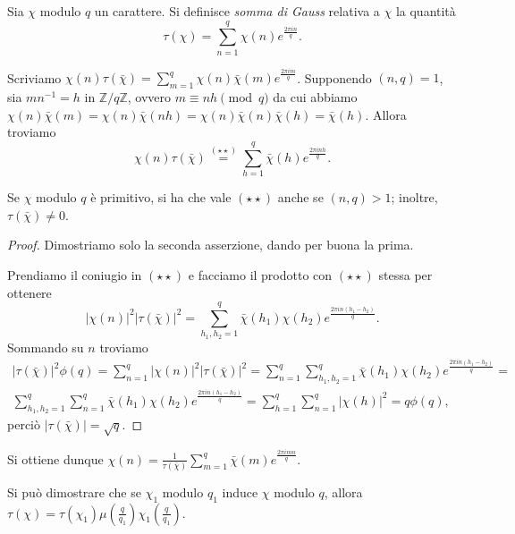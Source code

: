 \begin{defn}
  Sia $\chi$ modulo $q$ un carattere. Si definisce \textit{somma di Gauss} relativa a $\chi$ la quantità
  $$\tau(\chi)=\sum_{n=1}^q\chi(n)e^{\frac{2\pi in}{q}}.$$
\end{defn}

\begin{oss}
  Scriviamo $\displaystyle \chi(n)\tau(\bar{\chi})=\sum_{m=1}^q \chi(n)\bar{\chi}(m)e^{\frac{2\pi im}{q}}$.
  Supponendo $(n,q)=1$, sia $mn^{-1}=h$ in $\mathbb{Z}/q \mathbb{Z}$, ovvero $m \equiv nh \pmod{q}$ da cui abbiamo $\chi(n)\bar{\chi}(m)=\chi(n)\bar{\chi}(nh)=\chi(n)\bar{\chi}(n)\bar{\chi}(h)=\bar{\chi}(h)$. Allora troviamo
  $$\chi(n)\tau(\bar{\chi})\overset{(\star\star)}{=}\sum_{h=1}^q \bar{\chi}(h)e^{\frac{2\pi inh}{q}}.$$
\end{oss}

\begin{prop}
  Se $\chi$ modulo $q$ è primitivo, si ha che vale $(\star\star)$ anche se $(n,q)>1$; inoltre, $\tau(\bar{\chi})\not=0$.
\end{prop}

\begin{proof}
  Dimostriamo solo la seconda asserzione, dando per buona la prima.

  Prendiamo il coniugio in $(\star\star)$ e facciamo il prodotto con $(\star\star)$ stessa per ottenere
  $$|\chi(n)|^2|\tau(\bar{\chi})|^2=\sum_{h_1,h_2=1}^q \bar{\chi}(h_1)\chi(h_2)e^{\frac{2\pi in(h_1-h_2)}{q}}.$$
  Sommando su $n$ troviamo
  \begin{gather*}
    |\tau(\bar{\chi})|^2\phi(q)=\sum_{n=1}^q |\chi(n)|^2|\tau(\bar{\chi})|^2=\sum_{n=1}^q \sum_{h_1,h_2=1}^q \bar{\chi}(h_1)\chi(h_2)e^{\frac{2\pi in(h_1-h_2)}{q}}= \\
    \sum_{h_1,h_2=1}^q \sum_{n=1}^q \bar{\chi}(h_1)\chi(h_2)e^{\frac{2\pi in(h_1-h_2)}{q}}=\sum_{h=1}^q \sum_{n=1}^q |\chi(h)|^2=q\phi(q),
  \end{gather*}
  perciò $|\tau(\bar{\chi})|=\sqrt{q}$.
\end{proof}

Si ottiene dunque $\displaystyle \chi(n)=\frac{1}{\tau(\bar{\chi})}\sum_{m=1}^q \bar{\chi}(m)e^{\frac{2\pi imn}{q}}$.

\begin{oss}
  Si può dimostrare che se $\chi_1$ modulo $q_1$ induce $\chi$ modulo $q$, allora $\tau(\chi)=\tau(\chi_1)\mu\left(\frac{q}{q_1}\right)\chi_1\left(\frac{q}{q_1}\right)$.
\end{oss}


